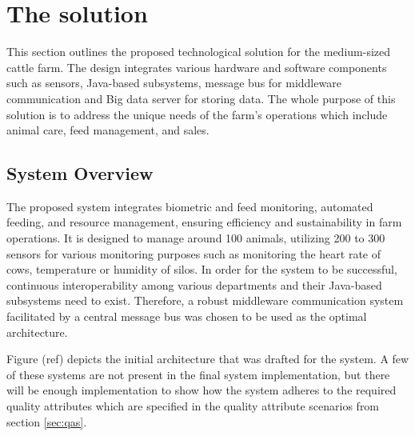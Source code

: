 \section{The solution}
\label{sec:middleware_architecture}

This section outlines the proposed technological solution for the medium-sized cattle farm. The design integrates various hardware and software components such as sensors, Java-based subsystems, message bus for middleware communication and Big data server for storing data. The whole purpose of this solution is to address the unique needs of the farm's operations which include animal care, feed management, and sales.

\subsection{\textbf{System Overview}}
The proposed system integrates biometric and feed monitoring, automated feeding, and resource management, ensuring efficiency and sustainability in farm operations. It is designed to manage around 100 animals, utilizing 200 to 300 sensors for various monitoring purposes such as monitoring the heart rate of cows, temperature or humidity of silos. In order for the system to be successful, continuous interoperability among various departments and their Java-based subsystems need to exist. Therefore, a robust middleware communication system facilitated by a central message bus was chosen to be used as the optimal architecture. \newline


Figure (ref)  depicts the initial architecture that was drafted for the system. A few of these systems are not present in the final system implementation, but there will be enough implementation to show how the system adheres to the required quality attributes which are specified in the quality attribute scenarios from section \ref{sec:qas}.

